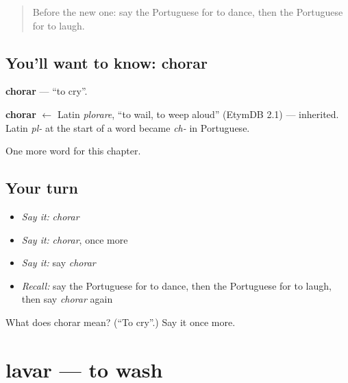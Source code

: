 \label{lesson:PT-C40-chorar}



\begin{quote}
Before the new one: say the Portuguese for to dance, then the Portuguese for to laugh.
\end{quote}

\subsection*{You'll want to know: chorar}
\textbf{chorar} — \textquotedblleft{}to cry\textquotedblright{}.

\begin{cousinweb}
\textbf{chorar} $\leftarrow$ Latin \emph{plorare}, \textquotedblleft{}to wail, to weep aloud\textquotedblright{} (EtymDB 2.1) — inherited. Latin \emph{pl-} at the start of a word became \emph{ch-} in Portuguese.
\end{cousinweb}

\begin{grammarlens}[title={What you've built}]
One more word for this chapter.
\end{grammarlens}

\subsection*{Your turn}
\begin{itemize}
\raggedright
  \item \emph{Say it:} \emph{chorar}
  \item \emph{Say it:} \emph{chorar}, once more
  \item \emph{Say it:} say \emph{chorar}
  \item \emph{Recall:} say the Portuguese for to dance, then the Portuguese for to laugh, then say \emph{chorar} again
\end{itemize}

\begin{tcolorbox}[breakable,colback=teal!4,colframe=teal!35!black,title={Before you move on}]
What does chorar mean? (\textquotedblleft{}To cry\textquotedblright{}.) Say it once more.
\end{tcolorbox}
\section[lavar]{lavar — to wash}

\label{lesson:PT-C40-lavar}



